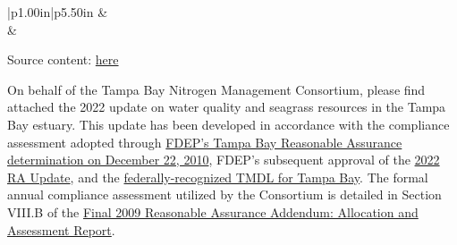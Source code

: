 \documentclass[
  letterpaper,
  DIV=11,
  numbers=noendperiod]{scrreprt}
\begin{document}
\begin{table}[H]
\begin{longtable}[l]{|p{1.00in}|p{5.50in}}
 &  \\





 &  \\





\end{longtable}

\end{table}

Source content:
\href{https://github.com/tbep-tech/tbnmc-compliance-assessment-2022}{here}

On behalf of the Tampa Bay Nitrogen Management Consortium, please find
attached the 2022 update on water quality and seagrass resources in the
Tampa Bay estuary. This update has been developed in accordance with the
compliance assessment adopted through
\href{https://drive.google.com/file/d/1wV3w8ack_fLNK3yS-xTR7LTmziNtZ8CN/view?usp=share_link}{FDEP's
Tampa Bay Reasonable Assurance determination on December 22, 2010},
FDEP's subsequent approval of the
\href{https://drive.google.com/file/d/1IIloBN5RoZPB6vgWzEjmMQyFjFL3fq0Y/view?usp=share_link}{2022
RA Update}, and the
\href{https://drive.google.com/file/d/18_W1qKT2I0j9m0mLC7wWjndSNR-0iWEF/view?usp=share_link}{federally-recognized
TMDL for Tampa Bay}. The formal annual compliance assessment utilized by
the Consortium is detailed in Section VIII.B of the
\href{https://drive.google.com/file/d/10IjJAfcGFf007a5VdPXAUtUi4dx-cmsA/view}{Final
2009 Reasonable Assurance Addendum: Allocation and Assessment Report}.
\end{document}
